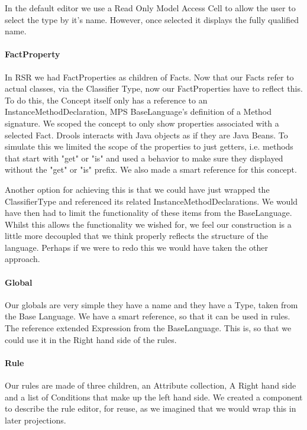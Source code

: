 In the default editor we use a Read Only Model Access Cell to allow the user to select the type by it's name.
However, once selected it displays the fully qualified name.

\paragraph{FactProperty} In RSR we had FactProperties as children of Facts. 
Now that our Facts refer to actual classes, via the Classifier Type, now our FactProperties have to reflect this.
To do this, the Concept itself only has a reference to an InstanceMethodDeclaration, MPS BaseLanguage's definition of a Method signature.
We scoped the concept to only show properties associated with a selected Fact.
Drools interacts with Java objects as if they are Java Beans.
To simulate this we limited the scope of the properties to just getters, i.e. methods that start with "get" or "is" and used a behavior to make sure they displayed without the "get" or "is" prefix.
We also made a smart reference for this concept.

Another option for achieving this is that we could have just wrapped the ClassifierType and referenced its related InstanceMethodDeclarations.
We would have then had to limit the functionality of these items from the BaseLanguage.
Whilst this allows the functionality we wished for, we feel our construction is a little more decoupled that we think properly reflects the structure of the language.
Perhaps if we were to redo this we would have taken the other approach.

\paragraph{Global} Our globals are very simple they have a name and they have a Type, taken from the Base Language.
We have a smart reference, so that it can be used in rules.
The reference extended Expression from the BaseLanguage.
This is, so that we could use it in the Right hand side of the rules. 

\paragraph{Rule} Our rules are made of three children, an Attribute collection, A Right hand side and a list of Conditions that make up the left hand side.
We created a component to describe the rule editor, for reuse, as we imagined that we would wrap this in later projections.

